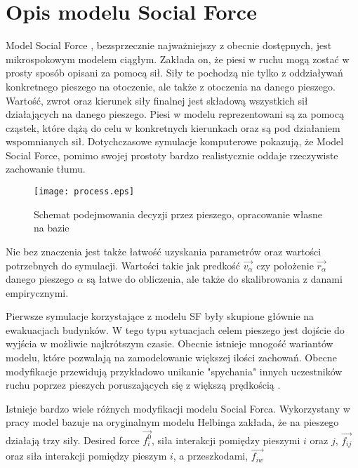 \chapter{Opis modelu Social Force}
\label{cha:OpisSocialForce}

Model Social Force \cite{SforceModelForPedDyn}, bezsprzecznie najważniejszy z obecnie dostępnych, jest mikrospokowym modelem ciągłym. Zakłada on, że piesi w ruchu mogą zostać w prosty sposób opisani za pomocą sił. Siły te pochodzą nie tylko z oddziaływań konkretnego pieszego na otoczenie, ale także z otoczenia na danego pieszego. Wartość, zwrot oraz kierunek siły finalnej jest składową wszystkich sił działających na danego pieszego. Piesi w modelu reprezentowani są za pomocą cząstek, które dążą do celu w konkretnych kierunkach oraz są pod działaniem wspomnianych sił. Dotychczasowe symulacje komputerowe pokazują, że Model Social Force, pomimo swojej prostoty bardzo realistycznie oddaje rzeczywiste zachowanie tłumu.

\begin{figure}
\centering
\texttt{[image: process.eps]}
\caption{Schemat podejmowania decyzji przez pieszego, opracowanie własne na bazie \cite{GuideCrowdDynViaModifiedSocialForceModel}}
\end{figure}

Nie bez znaczenia jest także łatwość uzyskania parametrów oraz wartości potrzebnych do symulacji. Wartości takie jak predkość $\vec{v_{\alpha}}$ czy położenie $\vec{r_{\alpha}}$ danego pieszego $\alpha$ są łatwe do obliczenia, ale także do skalibrowania z danami empirycznymi.

Pierwsze symulacje korzystające z modelu SF były skupione głównie na ewakuacjach budynków. W tego typu sytuacjach celem pieszego jest dojście do wyjścia w możliwie najkrótszym czasie. Obecnie istnieje mnogość wariantów modelu, które pozwalają na zamodelowanie większej ilości zachowań. Obecne modyfikacje przewidują przykładowo unikanie "spychania" innych uczestników ruchu poprzez pieszych poruszających się z większą prędkością \cite{6}.

Istnieje bardzo wiele różnych modyfikacji modelu Social Forca. Wykorzystany w pracy model \cite{GuideCrowdDynViaModifiedSocialForceModel} bazuje na oryginalnym modelu Helbinga \cite{SforceModelForPedDyn} zakłada, że na pieszego działają trzy siły. Desired force $\vec{f_{i}^{0}}$, siła interakcji pomiędzy pieszymi $i$ oraz $j$, $\vec{f_{ij}}$ oraz siła interakcji pomiędzy pieszym $i$, a przeszkodami, $\vec{f_{iw}}$

